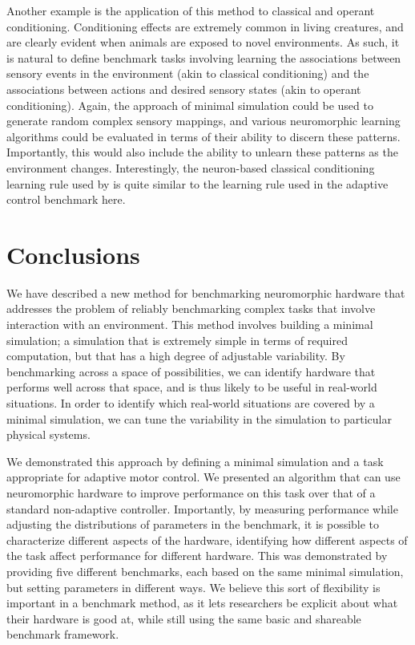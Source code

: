 \documentclass{frontiersSCNS} %
\begin{document}
Another example is the application of this method to classical and
operant conditioning.  Conditioning effects are extremely common in living
creatures, and are clearly evident when animals are exposed to novel environments.  As such,
it is natural to define benchmark tasks involving learning the associations between
sensory events in the environment (akin to classical conditioning) and the
associations between actions and desired sensory states (akin to operant
conditioning).  Again, the approach of minimal simulation could be used
to generate random complex sensory mappings, and various neuromorphic
learning algorithms could be evaluated in terms of their ability to
discern these patterns.  Importantly, this would also include the ability
to unlearn these patterns as the environment changes.  Interestingly, the
neuron-based classical conditioning learning rule used by \cite{verschure2003}
is quite similar to the learning rule used in the adaptive control benchmark
here.

\section {Conclusions}

We have described a new method for benchmarking
neuromorphic hardware that addresses the problem of reliably benchmarking
complex tasks that involve interaction with an environment.  This
method involves building a minimal simulation; a simulation that is extremely
simple in terms of required computation, but that has a high degree of
adjustable variability.  By benchmarking across a space of
possibilities, we can identify hardware that performs well across that
space, and is thus likely to be useful in real-world situations.  In order
to identify which real-world situations are covered by a minimal simulation,
we can tune the variability in the simulation to particular physical
systems.

We demonstrated this approach by defining a minimal simulation and a task
appropriate for adaptive motor control.  We presented an algorithm that
can use neuromorphic hardware to improve performance on this task over that
of a standard non-adaptive controller.  
Importantly, by measuring performance while adjusting the distributions of
parameters in the benchmark, it is possible to characterize different aspects
of the hardware, identifying how different aspects of the task affect
performance for different hardware.  This was demonstrated by providing
five different benchmarks, each based on the same minimal simulation, but
setting parameters in different ways.  We believe this sort of flexibility
is important in a benchmark method, as it lets researchers be explicit about what
their hardware is good at, while still using the same basic and shareable
benchmark framework.
\end{document}
